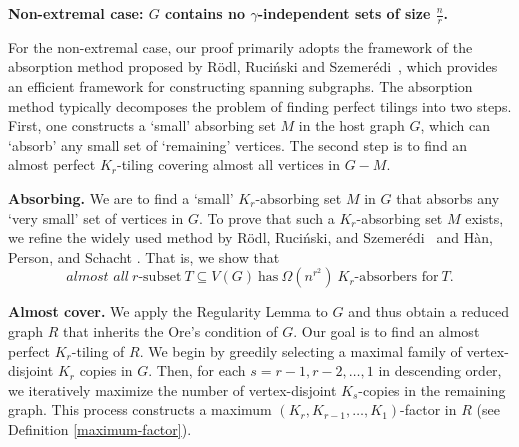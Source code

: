 \documentclass[11pt, a4paper]{article}
\theoremstyle{definition}
\newcommand{\<}{\subseteq}
\begin{document}
\medskip
\textbf{Non-extremal case: $G$ contains no $\gamma$-independent sets of size $\frac{n}{r}$.}
\medskip

For the non-extremal case, our proof primarily adopts the framework of the absorption method proposed by R\"odl, Ruci\'nski and Szemer\'edi~\cite{RRS2009}, which provides an efficient framework for constructing spanning subgraphs.
The absorption method typically decomposes the problem of finding perfect tilings into two steps. First, one constructs a `small' absorbing set $M$ in the host graph $G$, which can `absorb' any small set of `remaining' vertices. The second step is to find an almost perfect $K_r$-tiling covering almost all vertices in $G-M$.

{\bf Absorbing.} 
We are to find a `small'
$K_r$-absorbing set $M$ in $G$ that absorbs any `very small' set of vertices in $G$. To prove that such a $K_r$-absorbing set $M$ exists, we refine  the widely used method by R\"odl, Ruci\'nski, and Szemer\'edi~\cite{RRS2009} and H\`an, Person, and Schacht  \cite{Han2009}. That is, we show that
$$
\textit{almost all}\ r\text{-subset}\ T\subseteq V(G)\ \text{has}\  \Omega(n^{r^2})\ K_r\text{-absorbers for}\ T.
$$



 
{\bf Almost cover.} 
 We apply the Regularity Lemma to $G$ and thus obtain a reduced graph $R$ that inherits the Ore's condition of $G$. Our goal is to find an almost perfect $K_r$-tiling of $R$. We begin by greedily selecting a maximal family of vertex-disjoint $K_r$ copies in $G$. %
 Then, for each 
$s=r-1,r-2,\ldots,1$ in descending order, we iteratively maximize the number of vertex-disjoint $K_s$-copies in the remaining graph. This process constructs  a maximum $(K_r,K_{r-1},\ldots,K_1)$-factor in $R$ (see Definition \ref{maximum-factor}). 
\end{document}
